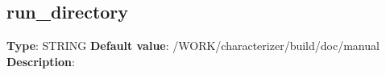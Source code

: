 \subsection*{run_directory}
\textbf{Type}: STRING\newline
\textbf{Default value}: /WORK/characterizer/build/doc/manual\newline
\textbf{Description}: